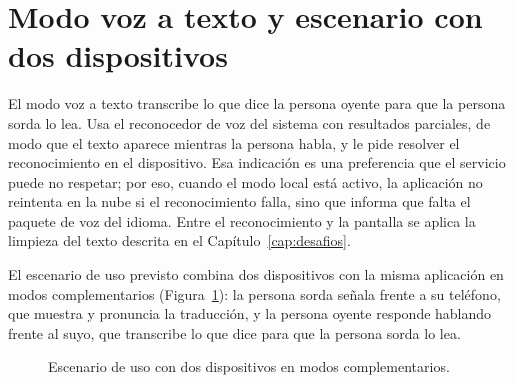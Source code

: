 \section{Modo voz a texto y escenario con dos dispositivos}

El modo voz a texto transcribe lo que dice la persona oyente para que la persona sorda lo lea. Usa el reconocedor de voz del sistema con resultados parciales, de modo que el texto aparece mientras la persona habla, y le pide resolver el reconocimiento en el dispositivo. Esa indicación es una preferencia que el servicio puede no respetar; por eso, cuando el modo local está activo, la aplicación no reintenta en la nube si el reconocimiento falla, sino que informa que falta el paquete de voz del idioma. Entre el reconocimiento y la pantalla se aplica la limpieza del texto descrita en el Capítulo~\ref{cap:desafios}.

El escenario de uso previsto combina dos dispositivos con la misma aplicación en modos complementarios (Figura~\ref{fig:dos-dispositivos}): la persona sorda señala frente a su teléfono, que muestra y pronuncia la traducción, y la persona oyente responde hablando frente al suyo, que transcribe lo que dice para que la persona sorda lo lea.

\begin{figure}[h]
    \centering
    \caption{Escenario de uso con dos dispositivos en modos complementarios.}
    \label{fig:dos-dispositivos}
\end{figure}

